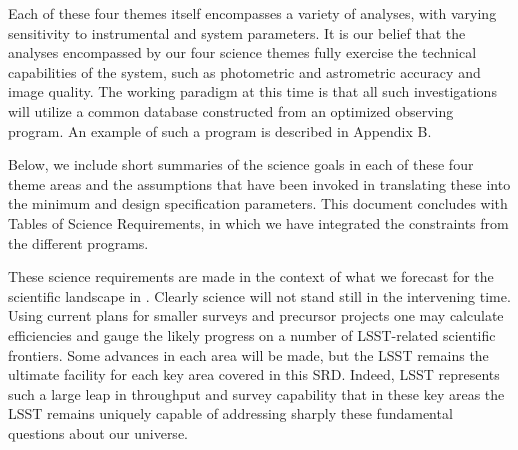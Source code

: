 Each of these four themes itself encompasses a variety of analyses, with
varying sensitivity to instrumental and system parameters.  It is our belief
that the analyses encompassed by our four science themes
fully exercise the technical capabilities of the system,
such as photometric and astrometric accuracy and image quality.  The working
paradigm at this time is that all such investigations will utilize a common
database constructed from an optimized observing program. An example of
such a program is described in Appendix B.

Below, we include short summaries of the science goals in each of these four
theme areas and the assumptions that have been invoked in translating these
into the minimum and design specification parameters.  This document concludes
with Tables of Science Requirements, in which we have integrated the
constraints from the different programs.

These science requirements are made in the context of what we forecast for
the scientific landscape in  . Clearly science will not stand still in the
intervening time.   Using current plans for smaller surveys and precursor projects
one may calculate efficiencies and gauge the likely progress on a number of
LSST-related scientific frontiers. Some advances in each area will be made,
but the LSST remains the ultimate facility for each key area covered in this SRD.
Indeed, LSST represents such a large leap in throughput and survey capability
that in these key areas the LSST remains uniquely capable of addressing sharply
these fundamental questions about our universe.

